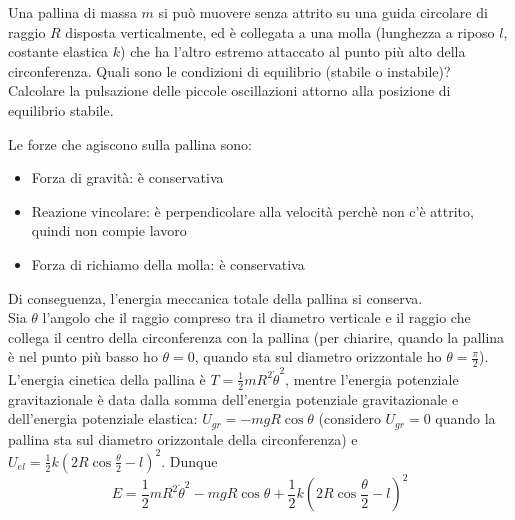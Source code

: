 \documentclass[../main.tex]{subfiles}
\begin{document}

\textex
Una pallina di massa $m$ si può muovere senza attrito su una guida circolare di raggio $R$ disposta verticalmente, ed è collegata a una molla (lunghezza a riposo $l$, costante elastica $k$) che ha l'altro estremo attaccato al punto più alto della circonferenza. Quali sono le condizioni di equilibrio (stabile o instabile)? Calcolare la pulsazione delle piccole oscillazioni attorno alla posizione di equilibrio stabile. %

\solution
Le forze che agiscono sulla pallina sono:
\begin{itemize}
\item Forza di gravità: è conservativa
\item Reazione vincolare: è perpendicolare alla velocità perchè non c'è attrito, quindi non compie lavoro
\item Forza di richiamo della molla: è conservativa
\end{itemize}
Di conseguenza, l'energia meccanica totale della pallina si conserva. \\

Sia $\theta$ l'angolo che il raggio compreso tra il diametro verticale e il raggio che collega il centro della circonferenza con la pallina (per chiarire, quando la pallina è nel punto più basso ho $\theta = 0$, quando sta sul diametro orizzontale ho $\theta = \frac{\pi}{2}$). L'energia cinetica della pallina è $T=\frac{1}{2}mR^2\dot\theta^2$, mentre l'energia potenziale gravitazionale è data dalla somma dell'energia potenziale gravitazionale e dell'energia potenziale elastica: $U_{gr} = -mgR\cos\theta$ (considero $U_{gr}=0$ quando la pallina sta sul diametro orizzontale della circonferenza) e $U_{el} = \frac{1}{2}k\left ( 2R\cos\frac{\theta}{2} - l\right )^2$. Dunque
\begin{equation}\label{ccm:ConsEnergia}
	E = \frac{1}{2}mR^2\dot\theta^2 - mgR\cos\theta + \frac{1}{2}k\left ( 2R\cos\frac{\theta}{2} - l\right ) ^2
\end{equation}
\end{document}
